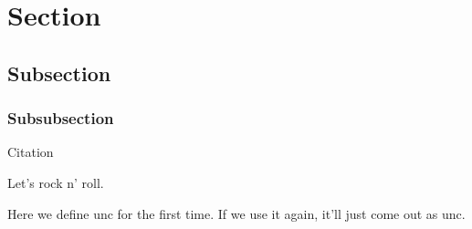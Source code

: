 \section{Section}
\subsection{Subsection}
\subsubsection{Subsubsection}
Citation \cite{bibkey1}

Let's rock n' roll.

Here we define \gls{unc} for the first time. If we use it again, it'll just come out as \gls{unc}.